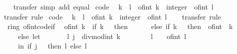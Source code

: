 \begin{isabellebody}
%
\isadelimproof
\ \ %
\endisadelimproof
%
\isatagproof
{}\isamarkupfalse%
\ transfer\ {\isacharparenleft}simp\ add{\isacharcolon}\ equal{\isacharparenright}%
\endisatagproof
{\isafoldproof}%
%
\isadelimproof
\isanewline
%
\endisadelimproof
\isanewline
{}\isamarkupfalse%
\ {\isacharbrackleft}code{\isacharbrackright}{\isacharcolon}\isanewline
\ \ {\isachardoublequoteopen}k\ {\isasymle}\ l\ {\isasymlongleftrightarrow}\ {\isacharparenleft}of{\isacharunderscore}int\ k\ {\isacharcolon}{\isacharcolon}\ integer{\isacharparenright}\ {\isasymle}\ of{\isacharunderscore}int\ l{\isachardoublequoteclose}\isanewline
%
\isadelimproof
\ \ %
\endisadelimproof
%
\isatagproof
{}\isamarkupfalse%
\ transfer\ rule%
\endisatagproof
{\isafoldproof}%
%
\isadelimproof
\isanewline
%
\endisadelimproof
\isanewline
{}\isamarkupfalse%
\ {\isacharbrackleft}code{\isacharbrackright}{\isacharcolon}\isanewline
\ \ {\isachardoublequoteopen}k\ {\isacharless}\ l\ {\isasymlongleftrightarrow}\ {\isacharparenleft}of{\isacharunderscore}int\ k\ {\isacharcolon}{\isacharcolon}\ integer{\isacharparenright}\ {\isacharless}\ of{\isacharunderscore}int\ l{\isachardoublequoteclose}\isanewline
%
\isadelimproof
\ \ %
\endisadelimproof
%
\isatagproof
{}\isamarkupfalse%
\ transfer\ rule%
\endisatagproof
{\isafoldproof}%
%
\isadelimproof
\isanewline
%
\endisadelimproof
{}\isamarkupfalse%
\isanewline
\isanewline
{}\isamarkupfalse%
\ {\isacharparenleft}\ ring{\isacharunderscore}{}{\isacharparenright}\ of{\isacharunderscore}int{\isacharunderscore}code{\isacharunderscore}if{\isacharcolon}\isanewline
\ \ {\isachardoublequoteopen}of{\isacharunderscore}int\ k\ {\isacharequal}\ {\isacharparenleft}if\ k\ {\isacharequal}\ {}\ then\ {}\isanewline
\ \ \ \ \ else\ if\ k\ {\isacharless}\ {}\ then\ {\isacharminus}\ of{\isacharunderscore}int\ {\isacharparenleft}{\isacharminus}\ k{\isacharparenright}\isanewline
\ \ \ \ \ else\ let\isanewline
\ \ \ \ \ \ \ {\isacharparenleft}l{\isacharcomma}\ j{\isacharparenright}\ {\isacharequal}\ divmod{\isacharunderscore}int\ k\ {}{\isacharsemicolon}\isanewline
\ \ \ \ \ \ \ l{\isacharprime}\ {\isacharequal}\ {}\ {\isacharasterisk}\ of{\isacharunderscore}int\ l\isanewline
\ \ \ \ \ in\ if\ j\ {\isacharequal}\ {}\ then\ l{\isacharprime}\ else\ l{\isacharprime}\ {\isacharplus}\ {}{\isacharparenright}{\isachardoublequoteclose}\isanewline
%
\isadelimproof
%
\endisadelimproof
%
\isatagproof

\end{isabellebody}
